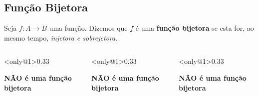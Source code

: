 \subsection{Função Bijetora}
\begin{frame}
  \begin{definition}
    Seja $f:A\rightarrow B$ uma função. Dizemos que $f$ é uma \textbf{função bijetora} se esta for, ao mesmo tempo, \emph{injetora e sobrejetora}.
  \end{definition}
  \begin{columns}[onlytextwidth]
    \begin{column}<only@1>{0.33\textwidth}\vspace*{0.4cm}
      \begin{figure}
      \end{figure}
      \begin{center}
        \textbf{NÃO é uma função bijetora}
      \end{center}
    \end{column}
    \begin{column}<only@1>{0.33\textwidth}\vspace*{0.4cm}
      \begin{figure}
      \end{figure}
      \begin{center}
        \textbf{NÃO é uma função bijetora}
      \end{center}
    \end{column}
    \begin{column}<only@1>{0.33\textwidth}\vspace*{0.4cm}
      \begin{figure}
      \end{figure}
      \begin{center}
        \textbf{NÃO é uma função bijetora}
      \end{center}
    \end{column}
  \end{columns}
\end{frame}

